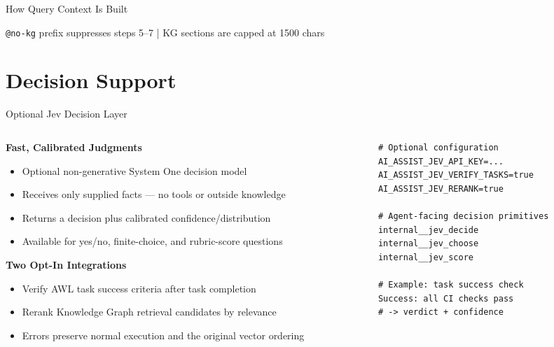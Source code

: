 \documentclass[aspectratio=169,10pt]{beamer}
\begin{document}
\begin{frame}[fragile]{How Query Context Is Built}

\vfill
{\scriptsize\color{gray}
\texttt{@no-kg} prefix suppresses steps 5--7 \quad|\quad
KG sections are capped at 1500 chars}
\end{frame}

\section{Decision Support}

\begin{frame}[fragile]{Optional Jev Decision Layer}
\begin{columns}[T]
\begin{column}{0.48\textwidth}
\textbf{\color{rhpurple}Fast, Calibrated Judgments}
\begin{itemize}\scriptsize
  \item Optional non-generative System One decision model
  \item Receives only supplied facts --- no tools or outside knowledge
  \item Returns a decision plus calibrated confidence/distribution
  \item Available for yes/no, finite-choice, and rubric-score questions
\end{itemize}

\medskip
\textbf{\color{rhgreen}Two Opt-In Integrations}
\begin{itemize}\scriptsize
  \item Verify AWL task success criteria after task completion
  \item Rerank Knowledge Graph retrieval candidates by relevance
  \item Errors preserve normal execution and the original vector ordering
\end{itemize}
\end{column}
\begin{column}{0.48\textwidth}
\begin{lstlisting}[style=code,basicstyle=\ttfamily\scriptsize]
# Optional configuration
AI_ASSIST_JEV_API_KEY=...
AI_ASSIST_JEV_VERIFY_TASKS=true
AI_ASSIST_JEV_RERANK=true

# Agent-facing decision primitives
internal__jev_decide
internal__jev_choose
internal__jev_score

# Example: task success check
Success: all CI checks pass
# -> verdict + confidence
\end{lstlisting}
\end{column}
\end{columns}
\end{frame}
\end{document}

